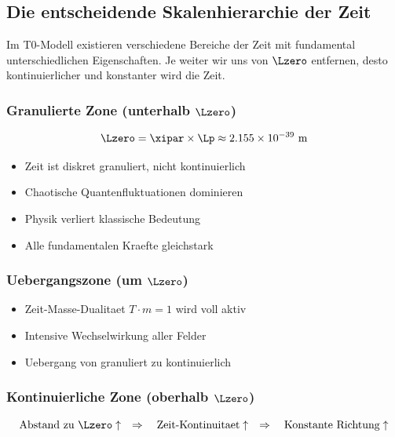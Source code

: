 	\subsection{Die entscheidende Skalenhierarchie der Zeit}
	
	Im T0-Modell existieren verschiedene Bereiche der Zeit mit fundamental unterschiedlichen Eigenschaften. Je weiter wir uns von $\Lzero$ entfernen, desto kontinuierlicher und konstanter wird die Zeit.
	
	\subsubsection{Granulierte Zone (unterhalb $\Lzero$)}
	
	\begin{equation}
		\Lzero = \xipar \times \Lp \approx 2.155 \times 10^{-39} \text{ m}
	\end{equation}
	
	\begin{itemize}
		\item Zeit ist diskret granuliert, nicht kontinuierlich
		\item Chaotische Quantenfluktuationen dominieren
		\item Physik verliert klassische Bedeutung
		\item Alle fundamentalen Kraefte gleichstark
	\end{itemize}
	
	\subsubsection{Uebergangszone (um $\Lzero$)}
	
	\begin{itemize}
		\item Zeit-Masse-Dualitaet $T \cdot m = 1$ wird voll aktiv
		\item Intensive Wechselwirkung aller Felder
		\item Uebergang von granuliert zu kontinuierlich
	\end{itemize}
	
	\subsubsection{Kontinuierliche Zone (oberhalb $\Lzero$)}
	
	\begin{tcolorbox}[colback=blue!5!white,colframe=blue!75!black,title=Zentrale Erkenntnis]
		\begin{equation}
			\text{Abstand zu } \Lzero \uparrow \quad \Rightarrow \quad \text{Zeit-Kontinuitaet} \uparrow \quad \Rightarrow \quad \text{Konstante Richtung} \uparrow
		\end{equation}
	\end{tcolorbox}
	
